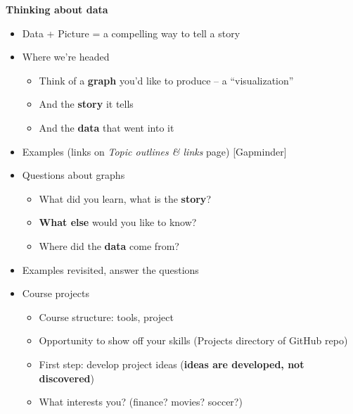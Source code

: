 


\pagestyle{headandfoot}
\runningheadrule
\firstpageheadrule
{}
\runningheader{}{}{}
\runningfooter{}{}{}



\centerline{\Large \bf Thinking about data}
\bigskip

\begin{itemize}

\item Data + Picture = a compelling way to tell a story

\item Where we're headed
\begin{itemize}
\item Think of a {\bf graph\/} you'd like to produce -- a ``visualization''
\item And the {\bf story\/} it tells
\item And the {\bf data\/} that went into it
\end{itemize}

\item Examples (links on {\it Topic outlines \& links\/} page) [Gapminder]

\item Questions about graphs
\begin{itemize}
\item What did you learn, what is the {\bf story\/}?
\item {\bf What else} would you like to know?
\item Where did the {\bf data\/} come from?
\end{itemize}

\item Examples revisited, answer the questions

\item Course projects
\begin{itemize}
\item Course structure:  tools, project
\item Opportunity to show off your skills (Projects directory of GitHub repo)
\item First step:  develop project ideas ({\bf ideas are developed, not discovered})
\item What interests {you}? (finance? movies?  soccer?)
\end{itemize}


\end{itemize}

